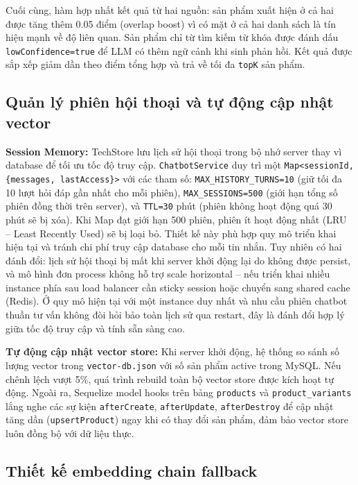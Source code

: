 Cuối cùng, hàm hợp nhất kết quả từ hai nguồn: sản phẩm xuất hiện ở cả hai được tăng thêm 0.05 điểm (overlap boost) vì có mặt ở cả hai danh sách là tín hiệu mạnh về độ liên quan. Sản phẩm chỉ từ tìm kiếm từ khóa được đánh dấu \texttt{lowConfidence=true} để LLM có thêm ngữ cảnh khi sinh phản hồi. Kết quả được sắp xếp giảm dần theo điểm tổng hợp và trả về tối đa \texttt{topK} sản phẩm.

\subsection{Quản lý phiên hội thoại và tự động cập nhật vector}

\textbf{Session Memory:} TechStore lưu lịch sử hội thoại trong bộ nhớ server thay vì database để tối ưu tốc độ truy cập. \texttt{ChatbotService} duy trì một \texttt{Map<sessionId, \{messages, lastAccess\}>} với các tham số: \texttt{MAX\_HISTORY\_TURNS=10} (giữ tối đa 10 lượt hỏi đáp gần nhất cho mỗi phiên), \texttt{MAX\_SESSIONS=500} (giới hạn tổng số phiên đồng thời trên server), và \texttt{TTL=30} phút (phiên không hoạt động quá 30 phút sẽ bị xóa). Khi Map đạt giới hạn 500 phiên, phiên ít hoạt động nhất (LRU -- Least Recently Used) sẽ bị loại bỏ. Thiết kế này phù hợp quy mô triển khai hiện tại và tránh chi phí truy cập database cho mỗi tin nhắn. Tuy nhiên có hai đánh đổi: lịch sử hội thoại bị mất khi server khởi động lại do không được persist, và mô hình đơn process không hỗ trợ scale horizontal -- nếu triển khai nhiều instance phía sau load balancer cần sticky session hoặc chuyển sang shared cache (Redis). Ở quy mô hiện tại với một instance duy nhất và nhu cầu phiên chatbot thuần tư vấn không đòi hỏi bảo toàn lịch sử qua restart, đây là đánh đổi hợp lý giữa tốc độ truy cập và tính sẵn sàng cao.

\textbf{Tự động cập nhật vector store:} Khi server khởi động, hệ thống so sánh số lượng vector trong \texttt{vector-db.json} với số sản phẩm active trong MySQL. Nếu chênh lệch vượt 5\%, quá trình rebuild toàn bộ vector store được kích hoạt tự động. Ngoài ra, Sequelize model hooks trên bảng \texttt{products} và \texttt{product\_variants} lắng nghe các sự kiện \texttt{afterCreate}, \texttt{afterUpdate}, \texttt{afterDestroy} để cập nhật tăng dần (\texttt{upsertProduct}) ngay khi có thay đổi sản phẩm, đảm bảo vector store luôn đồng bộ với dữ liệu thực.

\subsection{Thiết kế embedding chain fallback}
\label{sec:c3_embedding_chain}

